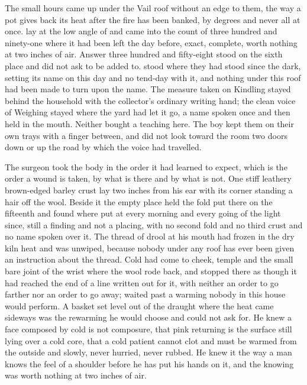 
The small hours came up under the Vail roof without an edge to them, the way a pot gives back its heat after the fire has been banked, by degrees and never all at once.  lay at the low angle of  and came into the count of three hundred and ninety-one where it had been left the day before, exact, complete, worth nothing at two inches of air. Answer three hundred and fifty-eight stood on the sixth place and did not ask to be added to.  stood where they had stood since the dark,  setting its name on this day and no tend-day with it, and nothing under this roof had been made to turn upon the name. The measure taken on Kindling stayed behind the household with the collector's ordinary writing hand; the clean voice of Weighing stayed where the yard had let it go, a name spoken once and then held in the mouth. Neither bought a teaching here. The boy kept them on their own trays with a finger between, and did not look toward the room two doors down or up the road by which the voice had travelled.

The surgeon took the body in the order it had learned to expect, which is the order a wound is taken, by what is there and by what is not. One stiff leathery brown-edged barley crust lay two inches from his ear with its corner standing a hair off the wool. Beside it the empty place held the fold put there on the fifteenth and found where put at every morning and every going of the light since, still a finding and not a placing, with no second fold and no third crust and no name spoken over it. The thread of drool at his mouth had frozen in the dry kiln heat and was unwiped, because nobody under any roof has ever been given an instruction about the thread. Cold had come to cheek, temple and the small bare joint of the wrist where the wool rode back, and stopped there as though it had reached the end of a line written out for it, with neither an order to go farther nor an order to go away;  waited past a warming nobody in this house would perform. A basket set level out of the draught where the heat came sideways was the rewarming he would choose and could not ask for. He knew a face composed by cold is not composure, that pink returning is the surface still lying over a cold core, that a cold patient cannot clot and must be warmed from the outside and slowly, never hurried, never rubbed. He knew it the way a man knows the feel of a shoulder before he has put his hands on it, and the knowing was worth nothing at two inches of air.

